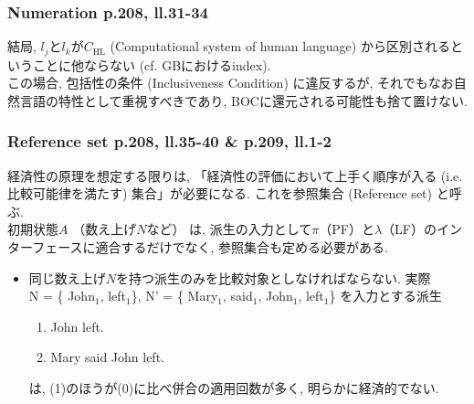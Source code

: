 \documentclass[dvipdfmx, xcolor={dvipsnames},12pt]{beamer}
\begin{document}
\begin{frame}
\frametitle{Numeration p.208, ll.31-34}
結局, $l_{j}$と$l_{k}$が$C_{\mathrm{HL}}$  (Computational system of human language) から区別されるということに他ならない (cf. GBにおけるindex).\\ この場合, 包括性の条件 (Inclusiveness Condition) に違反するが, それでもなお自然言語の特性として重視すべきであり, BOCに還元される可能性も捨て置けない.


\begin{center}
\end{center}
\end{frame}


\begin{frame}
\frametitle{Reference set p.208, ll.35-40 \& p.209, ll.1-2}

経済性の原理を想定する限りは, 「経済性の評価において上手く順序が入る (i.e. 比較可能律を満たす) 集合」が必要になる. これを参照集合 (Reference set) と呼ぶ. \\

初期状態$A$ （数え上げ$N$など） は, 派生の入力として$\pi$（PF）と$\lambda$（LF）のインターフェースに適合するだけでなく, 参照集合も定める必要がある.  
\begin{itemize}
 \item 同じ数え上げ$N$を持つ派生のみを比較対象としなければならない. 実際 \\
N = \{ John$_{1}$, left$_{1}$\}, N' = \{ Mary$_{1}$, said$_{1}$, John$_{1}$, left$_{1}$\} を入力とする派生
\begin{enumerate}
 \item[(0)] John left. 
 \item[(1)] Mary said John left.
\end{enumerate}
は, (1)のほうが(0)に比べ併合の適用回数が多く, 明らかに経済的でない.
\end{itemize}

\end{frame}
\end{document}
